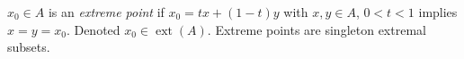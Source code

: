 $x_0\in A$ is an \emph{extreme point} if $x_0=tx+(1-t)y$ with $x,y\in A$, $0<t<1$ implies $x=y=x_0$. Denoted $x_0\in\operatorname{ext}(A)$. Extreme points are singleton extremal subsets.
